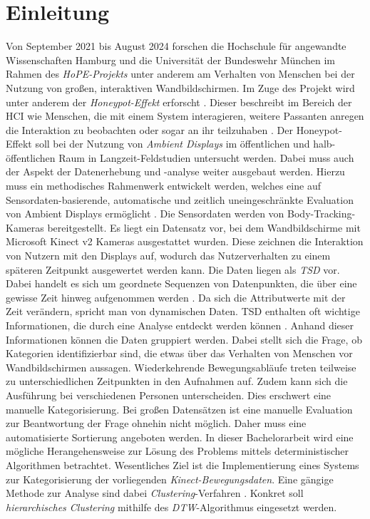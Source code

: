 \chapter{Einleitung}
\label{chapter1}
Von September 2021 bis August 2024 forschen die Hochschule für angewandte Wissenschaften Hamburg
und die Universität der Bundeswehr München im Rahmen des \emph{HoPE-Projekts} unter anderem am Verhalten
von Menschen bei der Nutzung von großen, interaktiven Wandbildschirmen.
Im Zuge des Projekt wird unter anderem der \emph{Honeypot-Effekt} erforscht \citep{unibw_honeypot-effekt_2021}.
Dieser beschreibt im Bereich der \ac{HCI} wie Menschen, die mit einem System interagieren,
weitere Passanten anregen die Interaktion zu beobachten oder sogar an ihr teilzuhaben \citep{wouters_uncovering_2016}.
Der Honeypot-Effekt soll bei der Nutzung von \emph{Ambient Displays} im öffentlichen
und halb-öffentlichen Raum in Langzeit-Feldstudien untersucht werden.
Dabei muss auch der Aspekt der Datenerhebung und -analyse weiter ausgebaut werden.
Hierzu muss ein methodisches Rahmenwerk entwickelt werden, welches eine auf Sensordaten-basierende,
automatische und zeitlich uneingeschränkte Evaluation von Ambient Displays ermöglicht \citep{unibw_honeypot-effekt_2021}.
Die Sensordaten werden von Body-Tracking-Kameras bereitgestellt.
Es liegt ein Datensatz vor, bei dem Wandbildschirme mit Microsoft Kinect v2 Kameras ausgestattet wurden.
Diese zeichnen die Interaktion von Nutzern mit den Displays auf,
wodurch das Nutzerverhalten zu einem späteren Zeitpunkt ausgewertet werden kann.
Die Daten liegen als \emph{\ac{TSD}} vor.
Dabei handelt es sich um geordnete Sequenzen von Datenpunkten,
die über eine gewisse Zeit hinweg aufgenommen werden \citep{ali_clustering_2019}.
Da sich die Attributwerte mit der Zeit verändern, spricht man von dynamischen Daten.
\ac{TSD} enthalten oft wichtige Informationen, die durch eine Analyse entdeckt werden können \citep{ali_clustering_2019}.
Anhand dieser Informationen können die Daten gruppiert werden.
Dabei stellt sich die Frage, ob Kategorien identifizierbar sind,
die etwas über das Verhalten von Menschen vor Wandbildschirmen aussagen.
Wiederkehrende Bewegungsabläufe treten teilweise zu unterschiedlichen Zeitpunkten in den Aufnahmen auf.
Zudem kann sich die Ausführung bei verschiedenen Personen unterscheiden.
Dies erschwert eine manuelle Kategorisierung.
Bei großen Datensätzen ist eine manuelle Evaluation zur Beantwortung der Frage ohnehin nicht möglich.
Daher muss eine automatisierte Sortierung angeboten werden.
In dieser Bachelorarbeit wird eine mögliche Herangehensweise zur Lösung des Problems mittels deterministischer Algorithmen betrachtet.
Wesentliches Ziel ist die Implementierung eines Systems zur Kategorisierung der vorliegenden \emph{Kinect-Bewegungsdaten}.
Eine gängige Methode zur Analyse sind dabei \emph{Clustering}-Verfahren \citep{aghabozorgi_time-series_2015}.
Konkret soll \emph{hierarchisches Clustering} mithilfe des \emph{\ac{DTW}}-Algorithmus eingesetzt werden.

